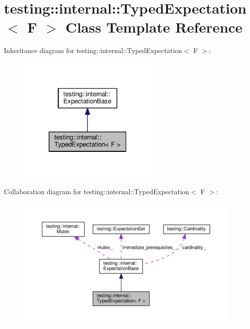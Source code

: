 \hypertarget{classtesting_1_1internal_1_1TypedExpectation}{}\section{testing\+:\+:internal\+:\+:Typed\+Expectation$<$ F $>$ Class Template Reference}
\label{classtesting_1_1internal_1_1TypedExpectation}


Inheritance diagram for testing\+:\+:internal\+:\+:Typed\+Expectation$<$ F $>$\+:\nopagebreak
\begin{figure}[H]
\begin{center}
\leavevmode
\includegraphics[width=199pt]{classtesting_1_1internal_1_1TypedExpectation__inherit__graph}
\end{center}
\end{figure}


Collaboration diagram for testing\+:\+:internal\+:\+:Typed\+Expectation$<$ F $>$\+:\nopagebreak
\begin{figure}[H]
\begin{center}
\leavevmode
\includegraphics[width=350pt]{classtesting_1_1internal_1_1TypedExpectation__coll__graph}
\end{center}
\end{figure}
